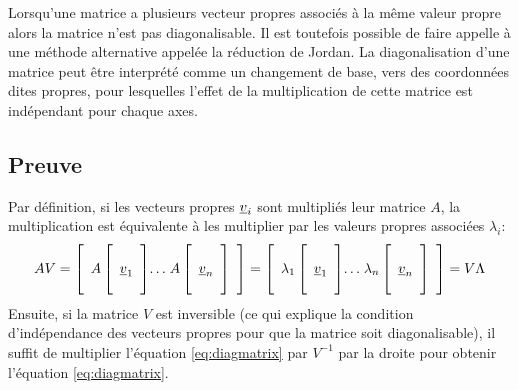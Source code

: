 Lorsqu'une matrice a plusieurs vecteur propres associés à la même valeur propre alors la matrice n'est pas diagonalisable. Il est toutefois possible de faire appelle à une méthode alternative appelée la réduction de Jordan. 
%
La diagonalisation d'une matrice peut être interprété comme un changement de base, vers des coordonnées dites propres, pour lesquelles l'effet de la multiplication de cette matrice est indépendant pour chaque axes. 


\subsection{Preuve}
\label{sec:preuvediag}

Par définition, si les vecteurs propres $\underline{v}_i$ sont multipliés leur matrice $A$, la multiplication est équivalente à les multiplier par les valeurs propres associées $\lambda_i$:
%
\begin{align}
A V = 
\left[ \begin{array}{c@{}c@{}c}  
A \left[   \begin{array}{c}  \\ \underline{v}_1 \\ \\ \end{array} \right] &  \ldots & \; A \left[  \begin{array}{c} \\ \underline{v}_n \\ \\ \end{array} \right]
\end{array} \right]
= 
\left[ \begin{array}{c@{}c@{}c}  
\lambda_1 \left[   \begin{array}{c}  \\ \underline{v}_1 \\ \\ \end{array} \right] &  \ldots & \;\lambda_n \left[  \begin{array}{c} \\  \underline{v}_n \\ \\ \end{array} \right]
\end{array} \right]
= V \Lambda
\end{align}
\label{eq:diagproof}
Ensuite, si la matrice $V$ est inversible (ce qui explique la condition d'indépendance des vecteurs propres pour que la matrice soit diagonalisable), il suffit de multiplier l'équation \eqref{eq:diagmatrix} par $V^{-1}$ par la droite pour obtenir l'équation \eqref{eq:diagmatrix}. 




